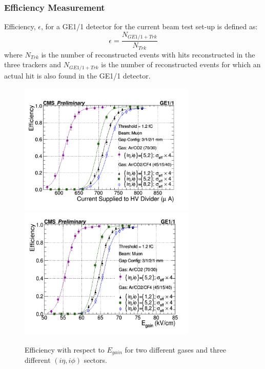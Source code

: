 \subsubsection{Efficiency Measurement}
Efficiency, $\epsilon$, for a GE1/1 detector for the current beam test set-up is defined as:
\begin{equation}
\epsilon = \frac{N_{GE1/1+Trk}}{N_{Trk}}
\end{equation}
where $N_{Trk}$ is the number of reconstructed events with hits reconstructed in the three trackers
and $N_{GE1/1+Trk}$ is the number of reconstructed events for which an actual hit is also found in the GE1/1 detector.
\begin{figure}[!htbp]
\centering
\includegraphics[width=0.75\textwidth]{figures/GEM/Efficiency_Current.jpeg}\\
\includegraphics[width=0.75\textwidth]{figures/GEM/Efficiency_EGain.jpeg}
\caption{Efficiency with respect to $E_{gain}$ for two different gases and three different $(i\eta,i\phi)$ sectors.}
\label{Efficiency}
\end{figure}
